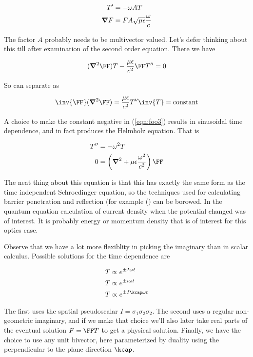 \begin{align}\label{eqn:foo5}
T' &= -\omega A T \\
\boldsymbol{\nabla} F &= F A \sqrt{\mu\epsilon} \frac{\omega}{c}
\end{align}

The factor $A$ probably needs to be multivector valued.  Let's defer thinking about this till after examination of the second order equation.  There we have

\begin{align*}
(\spacegrad^2 \FF) T - \frac{\mu\epsilon}{c^2} \FF T'' = 0
\end{align*}

So can separate as 

\begin{align}\label{eqn:foo3}
\inv{\FF} (\spacegrad^2 \FF) = \frac{\mu\epsilon}{c^2} T'' \inv{T} = \text{constant}
\end{align}

A choice to make the constant negative in (\ref{eqn:foo3}) results in sinusoidal time dependence, and in fact produces the Helmholz equation.  That is

\begin{align}\label{eqn:foo4}
T'' &= - \omega^2 T \\
  0 &= \left(\spacegrad^2 + \mu\epsilon \frac{\omega^2}{c^2} \right) \FF 
\end{align}

The neat thing about this equation is that this has exactly the same form as the time independent Schroedinger equation, so the techniques used for calculating barrier penetration and reflection (for example (\cite{bohm1989qt}) can be borowed.  In the quantum equation calculation of current density when the potential changed was of interest.  It is probably energy or momentum density that is of interest for this optics case.

Observe that we have a lot more flexiblity in picking the imaginary than in scalar calculus.  Possible solutions for the time dependence are

\begin{align*}
T &\propto e^{\pm I\omega t} \\
T &\propto e^{\pm i\omega t} \\
T &\propto e^{\pm I \kcap \omega t}
\end{align*}

The first uses the spatial pseudoscalar $I = \sigma_1 \sigma_2 \sigma_2$.  The second uses a regular non-geometric imaginary, and if we make that choice we'll also later take real parts of the eventual solution $F = \FF T$ to get a physical solution.  Finally, we have the choice to use any unit bivector, here parameterized by duality using the perpendicular to the plane direction $\kcap$.

\EndArticle
